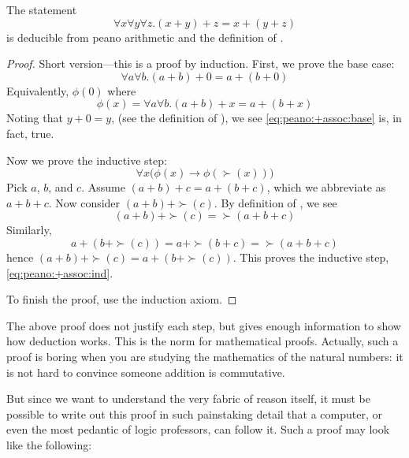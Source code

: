 \documentclass{scrbook}
\renewcommand{\implies}{\to}
\begin{document}
\begin{theorem}[$+$ is associative]
  The statement 
  \[
  \forall x \forall y \forall z . (x+y)+z = x+(y+z)
  \]
  is deducible from peano arithmetic and the definition of .
\end{theorem}
\begin{proof}
  Short version---this is a proof by induction. First, we prove the base case:
   \begin{equation}
    \label{eq:peano:+assoc:base}
    \forall a \forall b .  (a+b) + 0 = a+(b+0)
  \end{equation}
  Equivalently, $\phi(0)$ where
  \[
  \phi(x) = \forall a \forall b . (a+b)+x = a+(b+x)
  \]
  Noting that $y+0=y$, (see the definition of  ), we 
  see \cref{eq:peano:+assoc:base} is, in fact, true. 
 
  Now we prove the inductive step: 
  \begin{equation}
    \label{eq:peano:+assoc:ind}
    \forall x \bigl(\phi(x)\implies \phi(\succ(x))\bigr)   
  \end{equation}
  Pick $a$, $b$, and $c$. 
  Assume $(a+b)+c = a+(b+c)$, which we abbreviate as $a+b+c$. Now consider $(a+b)+\succ(c)$. By definition of , we see \[(a+b)+\succ(c)=\succ(a+b+c)\] Similarly, \[a+(b+\succ(c))=a+\succ(b+c)=\succ(a+b+c)\]
  hence $(a+b)+\succ(c)=a+(b+\succ(c))$. This proves the inductive step, \cref{eq:peano:+assoc:ind}.
  
  To finish the proof, use the induction axiom. 
\end{proof}

The above proof does not justify each step, but gives enough information to show how deduction works. This is the norm for mathematical proofs. Actually, such a proof is boring when you are studying the mathematics of the natural numbers: it is not hard to convince someone addition is commutative. 

But since we want to understand the very fabric of reason itself, it must be possible to write out this proof in such painstaking detail that a computer, or even the most pedantic of logic professors, can follow it. Such a proof may look like the following: 
\end{document}
